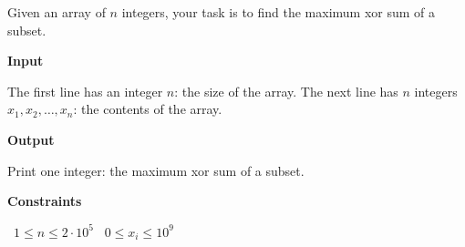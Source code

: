 Given an array of $n$ integers, your task is to find the maximum xor sum of a subset.

\vspace{0.3cm}\noindent\textbf{Input}

The first line has an integer $n$: the size of the array.
The next line has $n$ integers $x_1,x_2,\dots,x_n$: the contents of the array.

\vspace{0.3cm}\noindent\textbf{Output}

Print one integer: the maximum xor sum of a subset.

\vspace{0.3cm}\noindent\textbf{Constraints}

\textbullet\ $1 \le n \le 2 \cdot 10^5$
\textbullet\ $0 \le x_i \le 10^9$